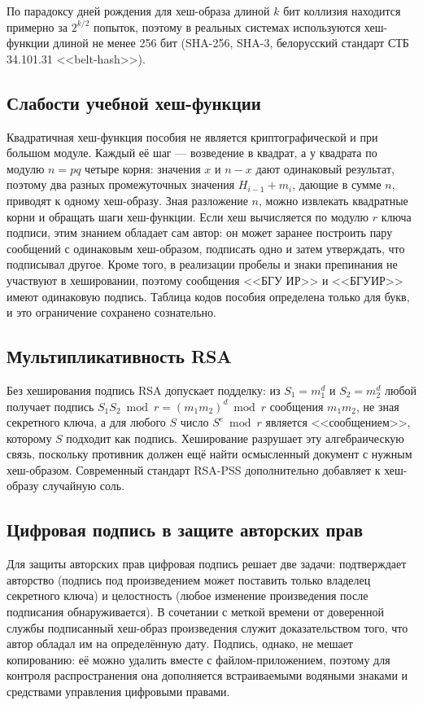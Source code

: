\documentclass[14pt,a4paper]{extarticle}
\begin{document}
По парадоксу дней рождения для хеш-образа длиной $k$ бит коллизия находится примерно
за $2^{k/2}$ попыток, поэтому в реальных системах используются хеш-функции длиной не
менее 256 бит (SHA-256, SHA-3, белорусский стандарт СТБ 34.101.31 <<belt-hash>>).

\subsection{Слабости учебной хеш-функции}

Квадратичная хеш-функция пособия не является криптографической и при большом модуле.
Каждый её шаг --- возведение в квадрат, а у квадрата по модулю $n = pq$ четыре
корня: значения $x$ и $n - x$ дают одинаковый результат, поэтому два разных
промежуточных значения $H_{i-1} + m_i$, дающие в сумме $n$, приводят к одному
хеш-образу. Зная разложение $n$, можно извлекать квадратные корни и обращать шаги
хеш-функции. Если хеш вычисляется по модулю $r$ ключа подписи, этим знанием обладает
сам автор: он может заранее построить пару сообщений с одинаковым хеш-образом,
подписать одно и затем утверждать, что подписывал другое. Кроме
того, в реализации пробелы и знаки препинания не участвуют в хешировании, поэтому
сообщения <<БГУ ИР>> и <<БГУИР>> имеют одинаковую подпись. Таблица кодов пособия
определена только для букв, и это ограничение сохранено сознательно.

\subsection{Мультипликативность RSA}

Без хеширования подпись RSA допускает подделку: из $S_1 = m_1^d$ и $S_2 = m_2^d$ любой
получает подпись $S_1 S_2 \bmod r = (m_1 m_2)^d \bmod r$ сообщения $m_1 m_2$, не зная
секретного ключа, а для любого $S$ число $S^e \bmod r$ является <<сообщением>>, которому
$S$ подходит как подпись. Хеширование разрушает эту алгебраическую связь, поскольку
противник должен ещё найти осмысленный документ с нужным хеш-образом. Современный
стандарт RSA-PSS дополнительно добавляет к хеш-образу случайную соль.

\subsection{Цифровая подпись в защите авторских прав}

Для защиты авторских прав цифровая подпись решает две задачи: подтверждает авторство
(подпись под произведением может поставить только владелец секретного ключа) и
целостность (любое изменение произведения после подписания обнаруживается).
В сочетании с меткой времени от доверенной службы подписанный хеш-образ произведения
служит доказательством того, что автор обладал им на определённую дату. Подпись,
однако, не мешает копированию: её можно удалить вместе с файлом-приложением,
поэтому для контроля распространения она дополняется встраиваемыми водяными знаками
и средствами управления цифровыми правами.
\end{document}

